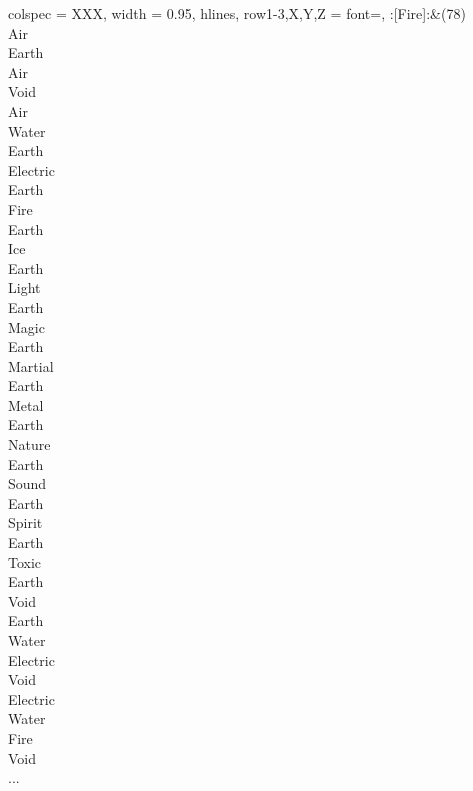 \begin{longtblr}[
	caption = {2v1 Defending Weak},
	label = {2v1-Defending-Weak},
]{
	colspec = {XXX}, width = 0.95\linewidth,
	hlines,
	row{1-3,X,Y,Z} = {font=\bfseries},
}
	:[Fire]:&{(78)\\
	Air \\
	Earth \\
	Air \\
	Void \\
	Air \\
	Water \\
	Earth \\
	Electric \\
	Earth \\
	Fire \\
	Earth \\
	Ice \\
	Earth \\
	Light \\
	Earth \\
	Magic \\
	Earth \\
	Martial \\
	Earth \\
	Metal \\
	Earth \\
	Nature \\
	Earth \\
	Sound \\
	Earth \\
	Spirit \\
	Earth \\
	Toxic \\
	Earth \\
	Void \\
	Earth \\
	Water \\
	Electric \\
	Void \\
	Electric \\
	Water \\
	Fire \\
	Void \\
	...\\
	}\\


\end{longtblr}
